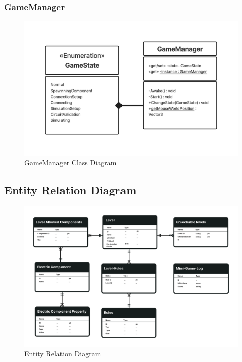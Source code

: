 \documentclass[../main.tex]{subfiles}
\begin{document}
\newpage
\subsubsection{GameManager}\begin{figure}[h!]
\centering
\includegraphics[scale=0.3]{images/chapter3/Class3.png}
\caption{GameManager Class Diagram}
\label{GameManager }
\end{figure}



\newpage
\subsection{Entity Relation Diagram }
\begin{figure}[h!]
\centering
\includegraphics[scale=0.15]{images/chapter3/ERD.png}
\caption{Entity Relation Diagram }
\label{Entity Relation Diagram }
\end{figure}
\end{document}
